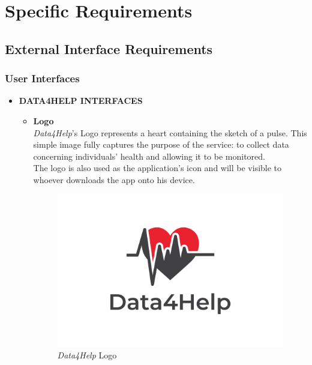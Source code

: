 \documentclass[titlepage]{article}
\begin{document}
\pagebreak	

\section{Specific Requirements}
	
	\subsection{External Interface Requirements}
		
		\subsubsection{User Interfaces}
		\begin{itemize}
			\item {\bf DATA4HELP INTERFACES} 
			\begin{itemize}

				\item{\bf Logo}\\
			{\it Data4Help}’s Logo represents a heart containing the sketch of a pulse. This simple image fully captures the purpose of the service: to collect data concerning individuals’ health and allowing it to be monitored. \\
The logo is also used as the application’s icon and will be visible to whoever downloads the app onto his device.
					\begin{figure}[H]
						\center
  						\includegraphics[width=0.7\columnwidth]{D4HLogo.jpg}
  						\caption{{\it Data4Help} Logo}
 						\label{fig:Logo}
					\end{figure}


\end{itemize}
\end{itemize}
\end{document}
